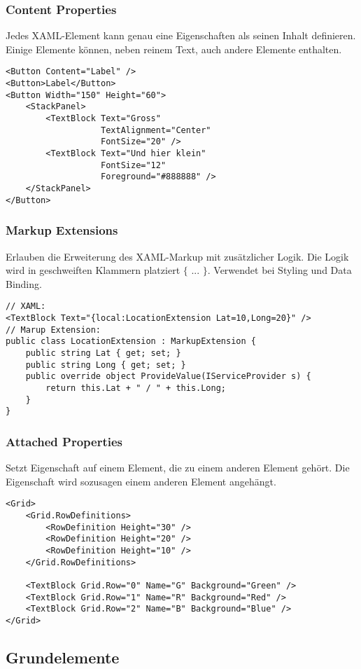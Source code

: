 \subsubsection{Content Properties}
Jedes XAML-Element kann genau eine Eigenschaften als seinen Inhalt definieren. Einige Elemente können, neben reinem Text, auch andere Elemente enthalten.
\begin{lstlisting}
<Button Content="Label" />
<Button>Label</Button>
<Button Width="150" Height="60">
    <StackPanel>
        <TextBlock Text="Gross"
                   TextAlignment="Center"
                   FontSize="20" />
        <TextBlock Text="Und hier klein"
                   FontSize="12"
                   Foreground="#888888" />
    </StackPanel>
</Button>
\end{lstlisting}
\subsubsection{Markup Extensions}
Erlauben die Erweiterung des XAML-Markup mit zusätzlicher Logik. Die Logik wird in geschweiften Klammern platziert $\{$ ... $\}$. Verwendet bei Styling und Data Binding.
\begin{lstlisting}
// XAML:
<TextBlock Text="{local:LocationExtension Lat=10,Long=20}" />
// Marup Extension:
public class LocationExtension : MarkupExtension {
    public string Lat { get; set; }
    public string Long { get; set; }
    public override object ProvideValue(IServiceProvider s) {
        return this.Lat + " / " + this.Long;
    }
}
\end{lstlisting}
\subsubsection{Attached Properties}
Setzt Eigenschaft auf einem Element, die zu einem anderen Element gehört. Die Eigenschaft wird sozusagen einem anderen Element angehängt.
\begin{lstlisting}
<Grid>
    <Grid.RowDefinitions>
        <RowDefinition Height="30" />
        <RowDefinition Height="20" />
        <RowDefinition Height="10" />
    </Grid.RowDefinitions>

    <TextBlock Grid.Row="0" Name="G" Background="Green" />
    <TextBlock Grid.Row="1" Name="R" Background="Red" />
    <TextBlock Grid.Row="2" Name="B" Background="Blue" />
</Grid>
\end{lstlisting}
\subsection{Grundelemente}
